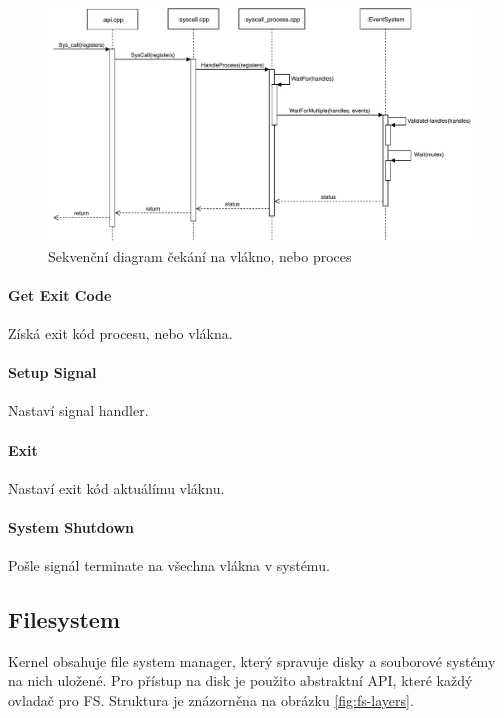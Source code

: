 \documentclass[11pt,a4paper]{scrartcl}
\begin{document}
	\begin{figure}[H]
		\centering
		\includegraphics[width=14cm]{wait-for-proc.pdf}
		\caption{Sekvenční diagram čekání na vlákno, nebo proces}
		\label{fig:wait-for-proc}
	\end{figure}
	
	\paragraph{Get Exit Code}
	Získá exit kód procesu, nebo vlákna.
	
	\paragraph{Setup Signal}
	Nastaví signal handler.
	
	\paragraph{Exit}
	Nastaví exit kód aktuálímu vláknu.
	
	\paragraph{System Shutdown}
	Pošle signál terminate na všechna vlákna v systému.

	
	\subsection{Filesystem}
	
	Kernel obsahuje file system manager, který spravuje disky a souborové systémy na nich uložené. Pro přístup na disk je použito abstraktní API, které každý ovladač pro FS. Struktura je znázorněna na obrázku \ref{fig:fs-layers}. 
	
\end{document}
